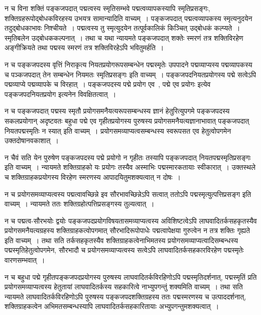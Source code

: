 				न च विना शक्तिं पङ्कजपदात् पद्मत्वस्य स्मृतिसम्भवे पद्मत्वव्यापकस्यापि स्मृतिप्रसङ्गः, शक्तिग्रहरूपोद्बोधकविरहस्य उभयत्र सामान्यादिति वाच्यम्~।  पङ्कजपदात् पद्मत्वव्यापकस्य स्मृत्यनुदयेन तदुद्बोधकाभावः निश्चीयते~।  पद्मत्वस्य तु स्मृत्युदयेन तत्पूर्वकालिकं  किञ्चित् उद्बोधकं कल्प्यते~।  स्मृतिबलेन उद्बोधककल्पनात्~।  तथा च यथा न्यायमते पङ्कजपदात् शक्तेः स्मरणं तत्र शक्तिविरहेण अङ्गीक्रियते तथा पद्मस्य स्मरणं तत्र शक्तिविरहेऽपि भवितुमर्हति~।

				न च पङ्कजपदस्य वृत्तिं निराकृत्य नियतप्रयोगरूपसम्बन्धेन पद्मस्मृतेः उपपादने पद्मव्याप्यस्य पद्मव्यापकस्य च पञ्कजपदात् तेन सम्बन्धेन नियमतः स्मृतिप्रसङ्गः इति वाच्यम्~।  पङ्कजपदनियतप्रयोगस्य पद्मे सत्वेऽपि  पद्मव्याप्ये पद्मव्यापके च विरहात्~।  पङ्कजपदस्य पद्मे प्रयोग एव~, पद्मे एव प्रयोगः  इत्येव पङ्कजपदनियतप्रयोग इत्यनेन विवक्षितत्वात्~। 
	
				न च पङ्कजपदात् पद्मस्य स्मृतौ प्रयोगसमनैयत्यरूपसम्बन्धस्य ज्ञानं हेतुरित्युपगमे  पङ्कजपदस्य सकलप्रयोगान् अदृष्टवतः बहुधा पद्मे एव गृहीतप्रयोगस्य पुरुषस्य प्रयोगसमनैयत्यज्ञानाभावात् पङ्कजपदात् नियतपद्मस्मृतिः न स्यात्  इति वाच्यम्~। प्रयोगसमव्याप्यत्वसम्बन्धस्य स्वरूपसत एव  हेतुत्वोपगमेन उक्तदोषानवकाशात्~। 

				न चैवं सति येन पुरुषेण पङ्कजपदस्य पद्मे प्रयोगो न गृहीतः तस्यापि पङ्कजपदात् नियतपद्मस्मृतिप्रसङ्गः इति वाच्यम्~।  न्यायमते शक्तिग्राहको यः प्रयोगः तस्यैव अस्माभिः पद्मस्मारकतायाः स्वीकारात्~।  उक्तस्थले च शक्तिग्राहकप्रयोगस्य  विरहेण स्मरणस्य आपादयितुमशक्यत्वात् न दोषः~। 

				न च प्रयोगसमव्याप्यत्वस्य पद्मत्वावच्छिन्ने इव सौरभावच्छिन्नेऽपि सत्वात् ततोऽपि पद्मस्मृत्युत्पत्तिप्रसङ्ग इति वाच्यम्~।  न्यायमते ततः शक्तिग्रहोत्पत्तिप्रसङ्गस्य तुल्यत्वात्~। 

				न च पद्मत्व-सौरभयोः द्वयोः पङ्कजपदप्रयोगविषयतासमव्याप्यत्वस्य अविशिष्टत्वेऽपि लाघवादितर्कसहकृतस्यैव प्रयोगसमनैयत्यग्रहस्य शक्तिग्राहकत्वोपगमात् सौरभादिरूपोपाधेः पद्मत्वापेक्षया गुरुत्वेन न तत्र शक्तिः गृह्यते  इति वाच्यम्~।  तथा सति तर्कसहकृतस्यैव शक्तिग्राहकत्वेनाभिमतस्य प्रयोगसमव्याप्यत्वादिसम्बन्धस्य पद्मस्मृतिहेतुत्वोपगमेन, सौरभादौ च प्रयोगसमव्याप्यत्वस्य सत्वेऽपि लाघवादितर्कसहकारविरहेण पद्मस्मृतेः वारणसम्भवात्~।
				
				न च बहुधा पद्मे गृहीतपङ्कजपदप्रयोगस्य पुरुषस्य  लाघवादितर्कविरहिणोऽपि पद्मस्मृतिदर्शनात्, पद्मस्मृतिं प्रति प्रयोगसमव्याप्यत्वस्य हेतुतायां लाघवादितर्कस्य सहकारित्वे नाभ्युपगन्तुं शक्यमिति वाच्यम्~। तथा सति न्यायमते लाघवादितर्कविरहिणोऽपि पुरुषस्य  पङ्कजपदशक्तिग्रहस्य  ततः पद्मस्मरणस्य च उत्पाददर्शनात्, शक्तिग्राहकत्वेन अभिमतसम्बन्धस्यापि  लाघवादितर्कसहकारितायाः अभ्युपगन्तुमशक्यत्वात्~।

